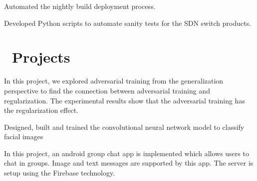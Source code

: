 \documentclass{resume}
\begin{document}

Automated the nightly build deployment process.


Developed Python scripts to automate sanity tests for the SDN switch products.

\section{\faUsers\ Projects}
In this project, we explored adversarial training from the generalization perspective to find the connection between adversarial training and regularization. The experimental results show that the adversarial training has the regularization effect.

Designed, built and trained the convolutional neural network model to classify facial images

In this project, an android group chat app is implemented which allows users to chat in groups. Image and text messages are supported by this app. The server is setup using the Firebase technology. 

%
%
\end{document}
